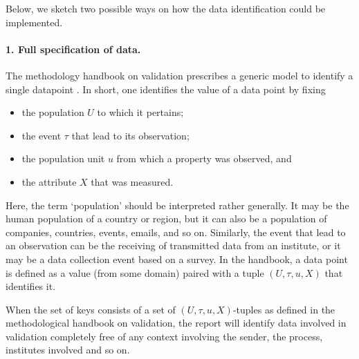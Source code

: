 Below, we sketch two possible ways on how the data identification could be
implemented.

\paragraph{1. Full specification of data.} The methodology handbook on validation
prescribes a generic model to identify a single datapoint
\citep[Chapter~5]{zio2015methodology}. In short, one identifies the value of a
data point by fixing
\begin{itemize}
\item the population $U$ to which it pertains;
\item the event $\tau$ that lead to its observation;
\item the population unit $u$ from which a property was observed, and
\item the attribute $X$ that was measured.
\end{itemize}
Here, the term `population' should be interpreted rather generally. It may be
the human population of a country or region, but it can also be a population of
companies, countries, events, emails, and so on. Similarly, the event that lead
to an observation can be the receiving of transmitted data from an institute,
or it may be a data collection event based on a survey.  In the handbook, a
data point is defined as a value (from some domain) paired with a tuple
$(U,\tau,u,X)$ that identifies it.


When the set of keys consists of a set of $(U,\tau,u,X)$-tuples as defined in
the methodological handbook on validation, the report will identify data
involved in validation completely free of any context involving the sender, the
process, institutes involved and so on. 

